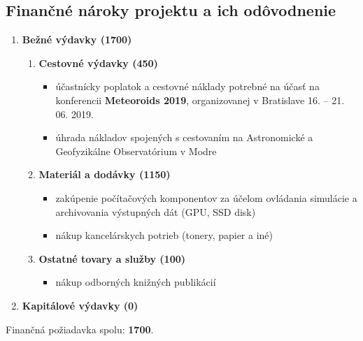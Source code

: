 \subsection{Finančné nároky projektu a ich
odôvodnenie}\label{finanux10dnuxe9-nuxe1roky-projektu-a-ich-oduxf4vodnenie}

\begin{enumerate}
\def\labelenumi{\arabic{enumi}.}
\tightlist
\item
  \textbf{Bežné výdavky (\SI{1700}{\eur})}

  \begin{enumerate}
  \def\labelenumii{\alph{enumii}.}
  \tightlist
  \item
    \textbf{Cestovné výdavky (\SI{450}{\eur})}

    \begin{itemize}
    \tightlist
    \item
      účastnícky poplatok a cestovné náklady potrebné na účasť na
      konferencii \textbf{Meteoroids 2019}, organizovanej v Bratislave
      16. -- 21. 06. 2019.
    \item
      úhrada nákladov spojených s cestovaním na Astronomické a
      Geofyzikálne Observatórium v Modre
    \end{itemize}
  \item
    \textbf{Materiál a dodávky (\SI{1150}{\eur})}

    \begin{itemize}
    \tightlist
    \item
      zakúpenie počítačových komponentov za účelom ovládania simulácie a
      archivovania výstupných dát (GPU, SSD disk)
    \item
      nákup kancelárskych potrieb (tonery, papier a iné)
    \end{itemize}
  \item
    \textbf{Ostatné tovary a služby (\SI{100}{\eur})}

    \begin{itemize}
    \tightlist
    \item
      nákup odborných knižných publikácií
    \end{itemize}
  \end{enumerate}
\item
  \textbf{Kapitálové výdavky (\SI{0}{\eur})}
\end{enumerate}

Finančná požiadavka spolu: \textbf{\SI{1700}{\eur}}.
